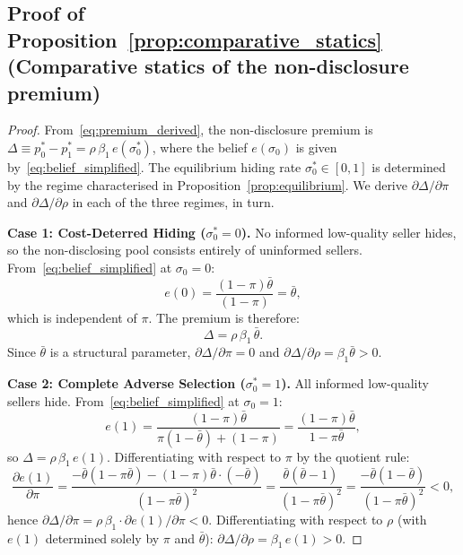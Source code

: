 \documentclass[10pt,letterpaper]{bp-template-concise}
\begin{document}
\subsection*{Proof of Proposition~\ref{prop:comparative_statics} (Comparative statics of the non-disclosure premium)}

\begin{proof}
From~\eqref{eq:premium_derived}, the non-disclosure premium is $\Delta\equiv p_0^*-p_1^*=\rho\,\beta_1\,e(\sigma_0^*)$, where the belief $e(\sigma_0)$ is given by~\eqref{eq:belief_simplified}. The equilibrium hiding rate $\sigma_0^*\in[0,1]$ is determined by the regime characterised in Proposition~\ref{prop:equilibrium}. We derive $\partial\Delta/\partial\pi$ and $\partial\Delta/\partial\rho$ in each of the three regimes, in turn.

\medskip
\textbf{Case 1: Cost-Deterred Hiding ($\sigma_0^*=0$).}
No informed low-quality seller hides, so the non-disclosing pool consists entirely of uninformed sellers. From~\eqref{eq:belief_simplified} at $\sigma_0=0$:
\begin{equation}
    e(0) = \frac{(1-\pi)\bar{\theta}}{(1-\pi)} = \bar{\theta},
\end{equation}
which is independent of $\pi$. The premium is therefore:
\begin{equation}
    \Delta = \rho\,\beta_1\,\bar{\theta}.
\end{equation}
Since $\bar{\theta}$ is a structural parameter, $\partial\Delta/\partial\pi=0$ and $\partial\Delta/\partial\rho=\beta_1\bar{\theta}>0$.

\medskip
\textbf{Case 2: Complete Adverse Selection ($\sigma_0^*=1$).}
All informed low-quality sellers hide. From~\eqref{eq:belief_simplified} at $\sigma_0=1$:
\begin{equation}
    e(1) = \frac{(1-\pi)\bar{\theta}}{\pi(1-\bar{\theta})+(1-\pi)} = \frac{(1-\pi)\bar{\theta}}{1-\pi\bar{\theta}},
\end{equation}
so $\Delta=\rho\,\beta_1\,e(1)$. Differentiating with respect to $\pi$ by the quotient rule:
\begin{equation}
    \frac{\partial e(1)}{\partial\pi}
        = \frac{-\bar{\theta}(1-\pi\bar{\theta})-(1-\pi)\bar{\theta}\cdot(-\bar{\theta})}{(1-\pi\bar{\theta})^2}
        = \frac{\bar{\theta}(\bar{\theta}-1)}{(1-\pi\bar{\theta})^2}
        = \frac{-\bar{\theta}(1-\bar{\theta})}{(1-\pi\bar{\theta})^2} < 0,
\end{equation}
hence $\partial\Delta/\partial\pi = \rho\,\beta_1\cdot\partial e(1)/\partial\pi < 0$.
Differentiating with respect to $\rho$ (with $e(1)$ determined solely by $\pi$ and $\bar\theta$):
$\partial\Delta/\partial\rho=\beta_1\,e(1)>0$.


\end{proof}
\end{document}
